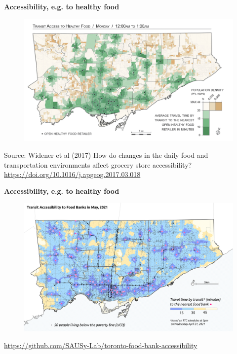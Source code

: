 \documentclass[aspectratio=169]{beamer}
\begin{document}

\begin{frame}
	
	\textbf{Accessibility, e.g. to healthy food}
	
	\begin{figure}
		\centering
		\includegraphics[width=0.94\linewidth]{images/food_midnight.png}
	\end{figure}
	
	\tiny Source: Widener et al (2017) How do changes in the daily food and transportation environments affect grocery store accessibility?
	\url{https://doi.org/10.1016/j.apgeog.2017.03.018}
	
\end{frame}




\begin{frame}
	
	\textbf{Accessibility, e.g. to healthy food}
	
	\begin{figure}
		\centering
		\includegraphics[width=0.94\linewidth]{images/foodbanks_access.png}
	\end{figure}
	
	\tiny 
	\url{https://github.com/SAUSy-Lab/toronto-food-bank-accessibility}
	
\end{frame}

\end{document}
